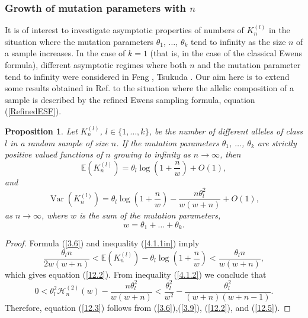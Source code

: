 \documentclass[12pt]{amsart}
\newtheorem{prop}[thm]{Proposition}
\theoremstyle{definition}
\numberwithin{equation}{section}
\DeclareMathOperator{\Var}{Var}
\begin{document}
\subsubsection{Growth of mutation parameters with $n$}
It is of interest to investigate asymptotic properties of numbers of  $K_n^{(l)}$ in the situation where the mutation
parameters $\theta_1$, $\ldots$, $\theta_k$ tend to infinity
as the size $n$ of a sample increases. In the case of $k=1$
(that is, in the case of the classical Ewens formula), different asymptotic regimes where both $n$ and the mutation parameter tend to infinity were considered in Feng \cite{FengL}, Tsukuda \cite{Tsukuda, Tsukuda1}. Our aim here is to extend some results obtained in Ref. \cite{Tsukuda} to the situation where the allelic composition of a sample is described by the refined Ewens sampling formula, equation (\ref{RefinedESF}).
\begin{prop}\label{Proposition12.1}
Let $K_n^{(l)}$, $l\in\{1,\ldots,k\}$, be the number of different alleles of class $l$ in a random sample of size $n$. If the mutation parameters $\theta_1$, $\ldots$, $\theta_k$  are strictly positive valued functions of $n$
growing to infinity as $n\rightarrow\infty$, then
\begin{equation}\label{12.2}
\mathbb{E}\left(K_n^{(l)}\right)=\theta_l\log\left(1+\frac{n}{w}\right)+O(1),
\end{equation}
and
\begin{equation}\label{12.3}
\Var\left(K_n^{(l)}\right)=\theta_l\log\left(1+\frac{n}{w}\right)
-\frac{n\theta_l^2}{w(w+n)}+O(1),
\end{equation}
as $n\rightarrow\infty$, where $w$ is the sum of the mutation parameters,
\begin{equation}\label{smalldablu}
w=\theta_1+\ldots+\theta_k.
\end{equation}
\end{prop}
\begin{proof}
Formula (\ref{3.6}) and inequality (\ref{4.1.1in}) imply
\begin{equation}\label{12.4}
\frac{\theta_ln}{2w(w+n)}<\mathbb{E}\left(K_n^{(l)}\right)-\theta_l\log\left(1+\frac{n}{w}\right)<\frac{\theta_ln}{w(w+n)},
\end{equation}
which gives equation (\ref{12.2}). From inequality (\ref{4.1.2}) we conclude that
\begin{equation}\label{12.5}
0<\theta_l^2\mathcal{H}_n^{(2)}(w)-\frac{n\theta^2_l}{w(w+n)}<\frac{\theta_l^2}{w^2}
-\frac{\theta_l^2}{(w+n)(w+n-1)}.
\end{equation}
Therefore, equation (\ref{12.3}) follows from (\ref{3.6}),(\ref{3.9}), (\ref{12.2}),  and (\ref{12.5}).
\end{proof}
\end{document}
